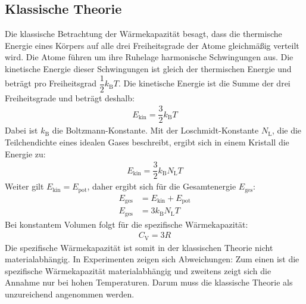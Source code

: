 \subsection{Klassische Theorie}
\label{sec:Klasische Theorie}
Die klassische Betrachtung der Wärmekapazität besagt, dass die thermische Energie eines Körpers auf alle drei Freiheitsgrade der Atome gleichmäßig verteilt wird. Die Atome führen um ihre Ruhelage harmonische Schwingungen aus. Die kinetische Energie dieser Schwingungen ist gleich der thermischen Energie und beträgt pro Freiheitsgrad $\dfrac{1}{2}k_\mathrm{B}T$. Die kinetische Energie ist die Summe der drei Freiheitsgrade und beträgt deshalb:
\begin{align}
  \label{eqn:klassische Energie}
 E_\mathrm{kin} = \dfrac{3}{2}k_\mathrm{B}T
\end{align}
Dabei ist $k_\mathrm{B}$ die Boltzmann-Konstante. Mit der Loschmidt-Konstante $N_\mathrm{L}$, die die Teilchendichte eines idealen Gases beschreibt, ergibt sich in einem Kristall die Energie zu:
\begin{align}
  \label{eqn:Energie im Kristallk}
 E_\mathrm{kin} = \dfrac{3}{2}k_\mathrm{B}N_\mathrm{L}T
\end{align}
Weiter gilt $E_\mathrm{kin}=E_\mathrm{pot}$, daher ergibt sich für die Gesamtenergie $E_\mathrm{ges}$:
\begin{align*}
  E_\mathrm{ges}&= E_\mathrm{kin}+E_\mathrm{pot} \\
  E_\mathrm{ges}&= 3 k_\mathrm{B}N_\mathrm{L}T
\end{align*}
Bei konstantem Volumen folgt für die spezifische Wärmekapazität:
\begin{align}
  \label{eqn:3R}
 C_\mathrm{V} = 3R
\end{align}
Die spezifische Wärmekapazität ist somit in der klassischen Theorie nicht materialabhängig. In Experimenten zeigen sich Abweichungen: Zum einen ist die spezifische Wärmekapazität materialabhängig und zweitens zeigt sich die Annahme nur bei hohen Temperaturen. Darum muss die klassische Theorie als unzureichend angenommen werden.
